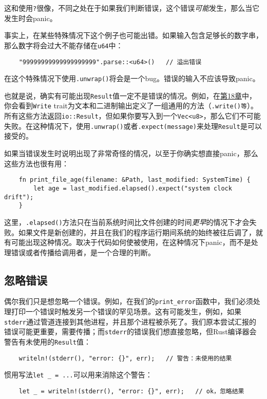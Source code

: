 这和使用\texttt{?}很像，不同之处在于如果我们判断错误，这个错误\emph{可能}发生，那么当它发生时会panic。

事实上，在某些特殊情况下这个例子也可能出错。如果输入包含足够长的数字串，那么数字将会过大不能存储在\texttt{u64}中：
\begin{verbatim}
    "99999999999999999999".parse::<u64>()   // 溢出错误
\end{verbatim}
在这个特殊情况下使用\texttt{.unwrap()}将会是一个bug。错误的输入不应该导致panic。

也就是说，确实有可能出现\texttt{Result}值一定不是错误的情况。例如，在\hyperref[ch18]{第18章}中，你会看到\texttt{Write} trait为文本和二进制输出定义了一组通用的方法（\texttt{.write()等}）。所有这些方法返回\texttt{io::Result}，但如果你要写入到一个\texttt{Vec<u8>}，那么它们不可能失败。在这种情况下，使用\texttt{.unwrap()}或者\texttt{.expect(message)}来处理\texttt{Result}是可以接受的。

如果当错误发生时说明出现了非常奇怪的情况，以至于你确实想直接panic，那么这些方法也很有用：
\begin{verbatim}
    fn print_file_age(filename: &Path, last_modified: SystemTime) {
        let age = last_modified.elapsed().expect("system clock drift");
    }
\end{verbatim}

这里，\texttt{.elapsed()}方法只在当前系统时间比文件创建的时间\emph{更早}的情况下才会失败。如果文件是新创建的，并且在我们的程序运行期间系统的始终被往后调了，就有可能出现这种情况。取决于代码如何使被使用，在这种情况下panic，而不是处理错误或者传播给调用者，是一个合理的判断。

\subsection{忽略错误}\label{ignoreerr}
偶尔我们只是想忽略一个错误。例如，在我们的\texttt{print\_error}函数中，我们必须处理打印一个错误时触发另一个错误的罕见场景。这有可能发生，例如，如果\texttt{stderr}通过管道连接到其他进程，并且那个进程被杀死了。我们原本尝试汇报的错误可能更重要，需要传播；而\texttt{stderr}的错误我们想直接忽略，但Rust编译器会警告有未使用的\texttt{Result}值：
\begin{verbatim}
    writeln!(stderr(), "error: {}", err);   // 警告：未使用的结果
\end{verbatim}

惯用写法\texttt{let \_ = ...}可以用来消除这个警告：
\begin{verbatim}
    let _ = writeln!(stderr(), "error: {}", err);   // ok，忽略结果
\end{verbatim}

